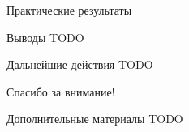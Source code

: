 \documentclass{beamer}
\begin{document}
\begin{frame}{Практические результаты}
\begin{block}{Выводы}
TODO
\end{block}
\end{frame}


\begin{frame}{Дальнейшие действия}
TODO
\end{frame}


\begin{frame}{}
\begin{center}
Спасибо за внимание!
\end{center}
\end{frame}

\begin{frame}{Дополнительные материалы}
TODO
\end{frame}
\end{document}
